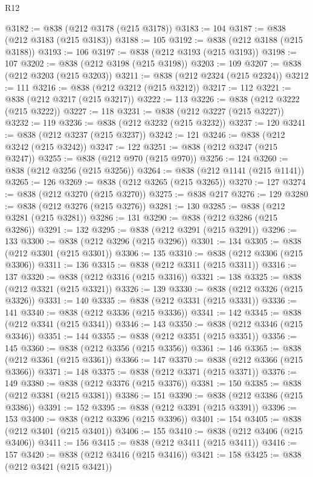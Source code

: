 \begin{lexlean}{R12}
\begin{coremodule}
@3182 := @838 (@212 @3178 (@215 @3178))
@3183 := 104
@3187 := @838 (@212 @3183 (@215 @3183))
@3188 := 105
@3192 := @838 (@212 @3188 (@215 @3188))
@3193 := 106
@3197 := @838 (@212 @3193 (@215 @3193))
@3198 := 107
@3202 := @838 (@212 @3198 (@215 @3198))
@3203 := 109
@3207 := @838 (@212 @3203 (@215 @3203))
@3211 := @838 (@212 @2324 (@215 @2324))
@3212 := 111
@3216 := @838 (@212 @3212 (@215 @3212))
@3217 := 112
@3221 := @838 (@212 @3217 (@215 @3217))
@3222 := 113
@3226 := @838 (@212 @3222 (@215 @3222))
@3227 := 118
@3231 := @838 (@212 @3227 (@215 @3227))
@3232 := 119
@3236 := @838 (@212 @3232 (@215 @3232))
@3237 := 120
@3241 := @838 (@212 @3237 (@215 @3237))
@3242 := 121
@3246 := @838 (@212 @3242 (@215 @3242))
@3247 := 122
@3251 := @838 (@212 @3247 (@215 @3247))
@3255 := @838 (@212 @970 (@215 @970))
@3256 := 124
@3260 := @838 (@212 @3256 (@215 @3256))
@3264 := @838 (@212 @1141 (@215 @1141))
@3265 := 126
@3269 := @838 (@212 @3265 (@215 @3265))
@3270 := 127
@3274 := @838 (@212 @3270 (@215 @3270))
@3275 := @838 @217
@3276 := 129
@3280 := @838 (@212 @3276 (@215 @3276))
@3281 := 130
@3285 := @838 (@212 @3281 (@215 @3281))
@3286 := 131
@3290 := @838 (@212 @3286 (@215 @3286))
@3291 := 132
@3295 := @838 (@212 @3291 (@215 @3291))
@3296 := 133
@3300 := @838 (@212 @3296 (@215 @3296))
@3301 := 134
@3305 := @838 (@212 @3301 (@215 @3301))
@3306 := 135
@3310 := @838 (@212 @3306 (@215 @3306))
@3311 := 136
@3315 := @838 (@212 @3311 (@215 @3311))
@3316 := 137
@3320 := @838 (@212 @3316 (@215 @3316))
@3321 := 138
@3325 := @838 (@212 @3321 (@215 @3321))
@3326 := 139
@3330 := @838 (@212 @3326 (@215 @3326))
@3331 := 140
@3335 := @838 (@212 @3331 (@215 @3331))
@3336 := 141
@3340 := @838 (@212 @3336 (@215 @3336))
@3341 := 142
@3345 := @838 (@212 @3341 (@215 @3341))
@3346 := 143
@3350 := @838 (@212 @3346 (@215 @3346))
@3351 := 144
@3355 := @838 (@212 @3351 (@215 @3351))
@3356 := 145
@3360 := @838 (@212 @3356 (@215 @3356))
@3361 := 146
@3365 := @838 (@212 @3361 (@215 @3361))
@3366 := 147
@3370 := @838 (@212 @3366 (@215 @3366))
@3371 := 148
@3375 := @838 (@212 @3371 (@215 @3371))
@3376 := 149
@3380 := @838 (@212 @3376 (@215 @3376))
@3381 := 150
@3385 := @838 (@212 @3381 (@215 @3381))
@3386 := 151
@3390 := @838 (@212 @3386 (@215 @3386))
@3391 := 152
@3395 := @838 (@212 @3391 (@215 @3391))
@3396 := 153
@3400 := @838 (@212 @3396 (@215 @3396))
@3401 := 154
@3405 := @838 (@212 @3401 (@215 @3401))
@3406 := 155
@3410 := @838 (@212 @3406 (@215 @3406))
@3411 := 156
@3415 := @838 (@212 @3411 (@215 @3411))
@3416 := 157
@3420 := @838 (@212 @3416 (@215 @3416))
@3421 := 158
@3425 := @838 (@212 @3421 (@215 @3421))

\end{coremodule}
\end{lexlean}
